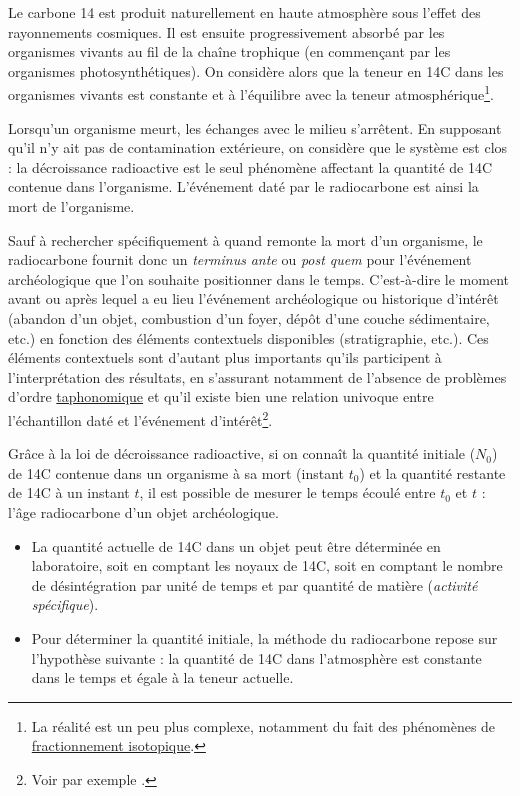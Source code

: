 \documentclass[
  french,
]{scrbook}
\providecommand{\tightlist}{%
  \setlength{\itemsep}{0pt}\setlength{\parskip}{0pt}}
\begin{document}
Le carbone 14 est produit naturellement en haute atmosphère sous l'effet des rayonnements cosmiques. Il est ensuite progressivement absorbé par les organismes vivants au fil de la chaîne trophique (en commençant par les organismes photosynthétiques). On considère alors que la teneur en 14C dans les organismes vivants est constante et à l'équilibre avec la teneur atmosphérique\footnote{La réalité est un peu plus complexe, notamment du fait des phénomènes de \href{https://fr.wikipedia.org/wiki/Fractionnement_isotopique}{fractionnement isotopique}.}.

Lorsqu'un organisme meurt, les échanges avec le milieu s'arrêtent. En supposant qu'il n'y ait pas de contamination extérieure, on considère que le système est clos : la décroissance radioactive est le seul phénomène affectant la quantité de 14C contenue dans l'organisme. L'événement daté par le radiocarbone est ainsi la mort de l'organisme.

Sauf à rechercher spécifiquement à quand remonte la mort d'un organisme, le radiocarbone fournit donc un \emph{terminus} \emph{ante} ou \emph{post quem} pour l'événement archéologique que l'on souhaite positionner dans le temps. C'est-à-dire le moment avant ou après lequel a eu lieu l'événement archéologique ou historique d'intérêt (abandon d'un objet, combustion d'un foyer, dépôt d'une couche sédimentaire, etc.) en fonction des éléments contextuels disponibles (stratigraphie, etc.). Ces éléments contextuels sont d'autant plus importants qu'ils participent à l'interprétation des résultats, en s'assurant notamment de l'absence de problèmes d'ordre \href{https://fr.wikipedia.org/wiki/Taphonomie}{taphonomique} et qu'il existe bien une relation univoque entre l'échantillon daté et l'événement d'intérêt\footnote{Voir par exemple \textcite{calabrisotto2017}.}.

Grâce à la loi de décroissance radioactive, si on connaît la quantité initiale (\(N_0\)) de 14C contenue dans un organisme à sa mort (instant \(t_0\)) et la quantité restante de 14C à un instant \(t\), il est possible de mesurer le temps écoulé entre \(t_0\) et \(t\) : l'âge radiocarbone d'un objet archéologique.

\begin{itemize}
\tightlist
\item
  La quantité actuelle de 14C dans un objet peut être déterminée en laboratoire, soit en comptant les noyaux de 14C, soit en comptant le nombre de désintégration par unité de temps et par quantité de matière (\emph{activité spécifique}).
\item
  Pour déterminer la quantité initiale, la méthode du radiocarbone repose sur l'hypothèse suivante : la quantité de 14C dans l'atmosphère est constante dans le temps et égale à la teneur actuelle.
\end{itemize}
\end{document}
